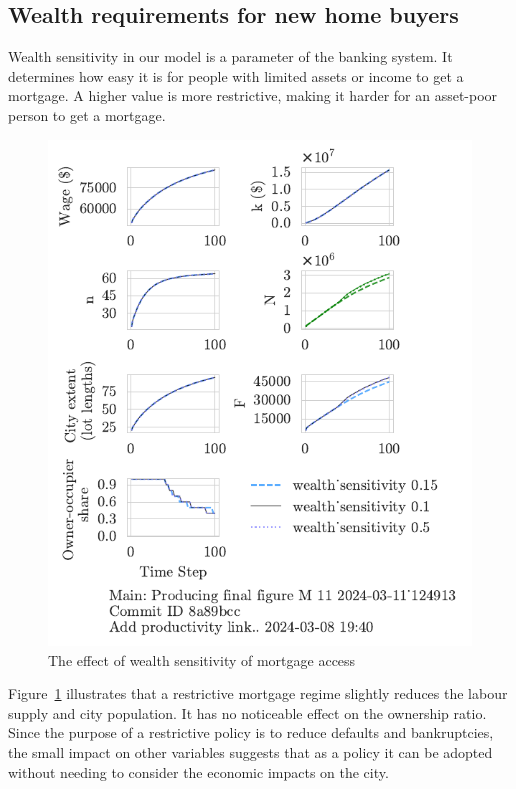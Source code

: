 \newpage

\subsection{Wealth requirements for new home buyers}
Wealth sensitivity in our model is a parameter of the banking system. It determines how easy it is for people with limited assets or income to get a mortgage. A higher value is more restrictive,  making it harder for an asset-poor person to get a mortgage.



\begin{figure}[h!bt]
    \centering
    \includegraphics[scale=1, trim={0 1.4cm 0 0},clip]{fig/wealth_sensitivity-124913.pdf}
    \caption{The effect of wealth sensitivity of mortgage access}
    \label{fig:wealth_sensitivity_ownership_trajectory}
\end{figure}

Figure~\ref{fig:wealth_sensitivity_ownership_trajectory} illustrates that a restrictive mortgage regime slightly reduces the labour supply and city population. It has no noticeable effect on the ownership ratio. Since the purpose of a restrictive policy is to reduce defaults and bankruptcies, the small impact on other variables suggests that as a policy it can be adopted without needing to consider the economic impacts on the city. 

